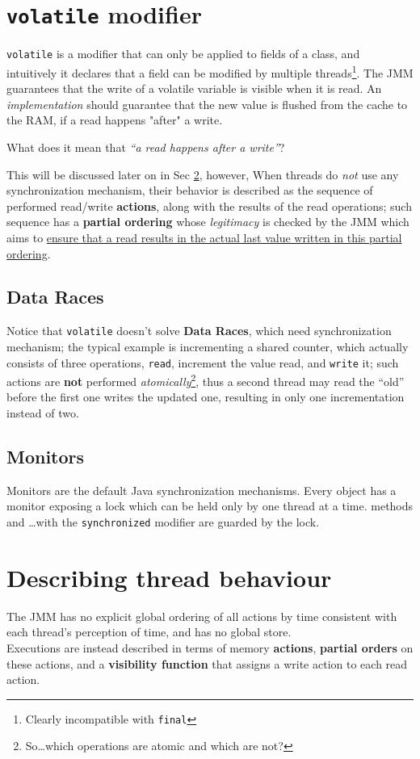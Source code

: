 \section{\texttt{volatile} modifier}
\lstinline|volatile| is a modifier that can only be applied to fields of a class,
and intuitively it declares that a field can be modified by multiple threads\footnote{Clearly incompatible with \lstinline|final|}.
The JMM guarantees that the write of a volatile variable is visible when it is read.
An \textit{implementation} should guarantee that the new value is flushed from the cache to the RAM, if a read happens "after" a write.

\begin{center}
   What does it mean that \textit{``a read happens after a write''}?
\end{center}
This will be discussed later on in Sec \ref{sec:behaviour_actions}, however,
When threads do \textit{not} use any synchronization mechanism,
their behavior is described as the sequence of performed read/write \textbf{actions},
along with the results of the read operations;
such sequence has a \textbf{partial ordering} whose \textit{legitimacy} is checked by the JMM
which aims to \ul{ensure that a read results in the actual last value written in this partial ordering}.

\subsection{Data Races}
Notice that \lstinline|volatile| doesn't solve \textbf{Data Races}, which need synchronization mechanism;
the typical example is incrementing a shared counter, which actually consists of three operations, \texttt{read}, increment the value read, and \texttt{write} it;
such actions are \textbf{not} performed \textit{atomically}\footnote{So\dots which operations are atomic and which are not?},
thus a second thread may read the ``old'' before the first one writes the updated one, 
resulting in only one incrementation instead of two.

\subsection{Monitors}
Monitors are the default Java synchronization mechanisms.
Every object has a monitor exposing a lock which can be held only by one thread at a time.
methods and \dots with the \lstinline|synchronized| modifier are guarded by the lock.

\section{Describing thread behaviour}
\label{sec:behaviour_actions}
The JMM has no explicit global ordering of all actions by time consistent with each thread's perception of time, and has no global store.\\
Executions are instead described in terms of memory \textbf{actions},
\textbf{partial orders} on these actions, and a \textbf{visibility function} that assigns a write action to each read action.

